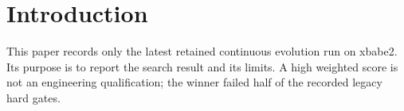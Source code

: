 \section{Introduction}This paper records only the latest retained continuous evolution run on xbabe2. Its purpose is to report the search result and its limits. A high weighted score is not an engineering qualification; the winner failed half of the recorded legacy hard gates.
